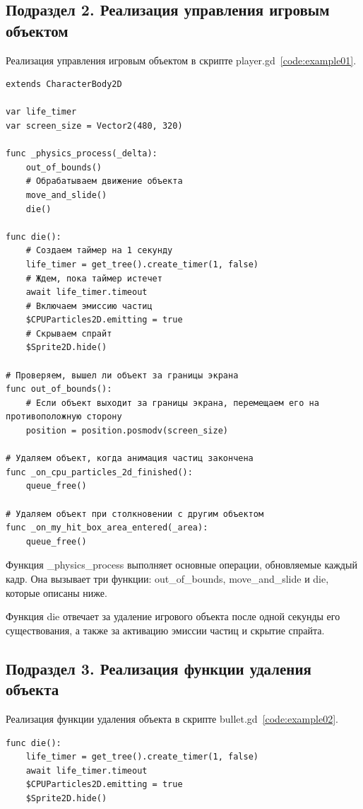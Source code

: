 \subsection{\label{subsec:ch02/sec01/sub02}Подраздел 2. Реализация управления игровым объектом}

Реализация управления игровым объектом в скрипте player.gd~\ref{code:example01}.
\begin{code}
\vspace{-\baselineskip}\begin{verbatim}
extends CharacterBody2D

var life_timer
var screen_size = Vector2(480, 320)

func _physics_process(_delta):
    out_of_bounds()
    # Обрабатываем движение объекта
    move_and_slide()
    die()

func die():
    # Создаем таймер на 1 секунду
    life_timer = get_tree().create_timer(1, false)
    # Ждем, пока таймер истечет
    await life_timer.timeout
    # Включаем эмиссию частиц
    $CPUParticles2D.emitting = true
    # Скрываем спрайт
    $Sprite2D.hide()

# Проверяем, вышел ли объект за границы экрана
func out_of_bounds():
    # Если объект выходит за границы экрана, перемещаем его на противоположную сторону
    position = position.posmodv(screen_size)

# Удаляем объект, когда анимация частиц закончена
func _on_cpu_particles_2d_finished():
    queue_free()

# Удаляем объект при столкновении с другим объектом
func _on_my_hit_box_area_entered(_area):
    queue_free()

\end{verbatim}
\end{code}

Функция \_physics\_process выполняет основные операции, обновляемые каждый кадр. Она вызывает три функции: out\_of\_bounds, move\_and\_slide и die, которые описаны ниже.

Функция die отвечает за удаление игрового объекта после одной секунды его существования, а также за активацию эмиссии частиц и скрытие спрайта.

\subsection{\label{subsec:ch02/sec01/sub03}Подраздел 3. Реализация функции удаления объекта}
Реализация функции удаления объекта в скрипте bullet.gd~\ref{code:example02}.
\begin{code}
\vspace{-\baselineskip}\begin{verbatim}
func die():
    life_timer = get_tree().create_timer(1, false)
    await life_timer.timeout
    $CPUParticles2D.emitting = true
    $Sprite2D.hide()
\end{verbatim}
\end{code}

